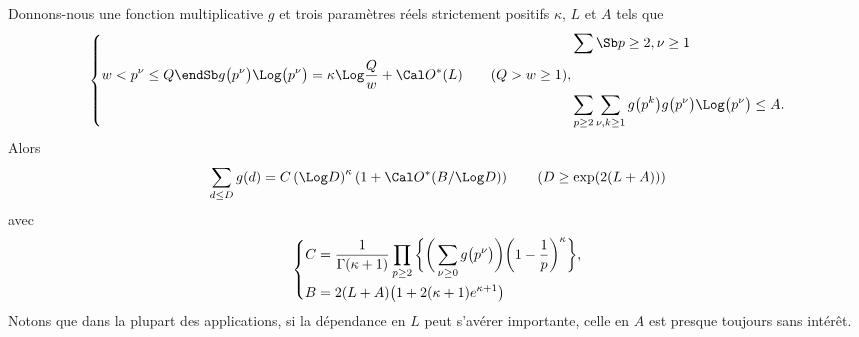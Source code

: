 Donnons-nous une fonction multiplicative $g$
et trois param\`etres
r\'eels strictement positifs $\kappa$, $L$ et $A$ tels que
$$
\left\{
\aligned
&\sum\Sb p\ge2, \nu\ge1\\ w<p^{\nu}\le Q\endSb
g\big(p^{\nu}\big)\Log\big(p^{\nu}\big)=
\kappa\Log\frac{Q}{w}+\Cal O^*(L)\qquad(Q>w\ge1),
\\&
\sum_{p\ge2}
\sum_{\nu,k\ge1}g\big(p^k\big)g\big(p^{\nu}\big)\Log\big(p^{\nu}\big)
\le A.
\endaligned
\right.
$$
Alors
$$
\sum_{d\le D}g(d)= C\left(\Log D\right)^{\kappa}
\left(1+\Cal O^*(B/\Log D)\right)\qquad (D\ge\exp(2(L+A)))
$$
avec
$$
\left\{
\aligned
C&=\frac{1}{\Gamma(\kappa+1)}
\prod_{p\ge2}\bigg\{
\bigg(\sum_{\nu\ge0}g\big(p^{\nu}\big)\bigg)
\bigg(1-\frac1p\bigg)^{\kappa}\bigg\},
\\
B&=2(L+A)\big(1+2(\kappa+1)e^{\kappa+1}\big)
\endaligned
\right.
$$
\endproclaim
Notons que dans la plupart des applications, si la d\'ependance en
$L$ peut s'av\'erer importante, celle en $A$ est presque toujours
sans int\'er\^et.

